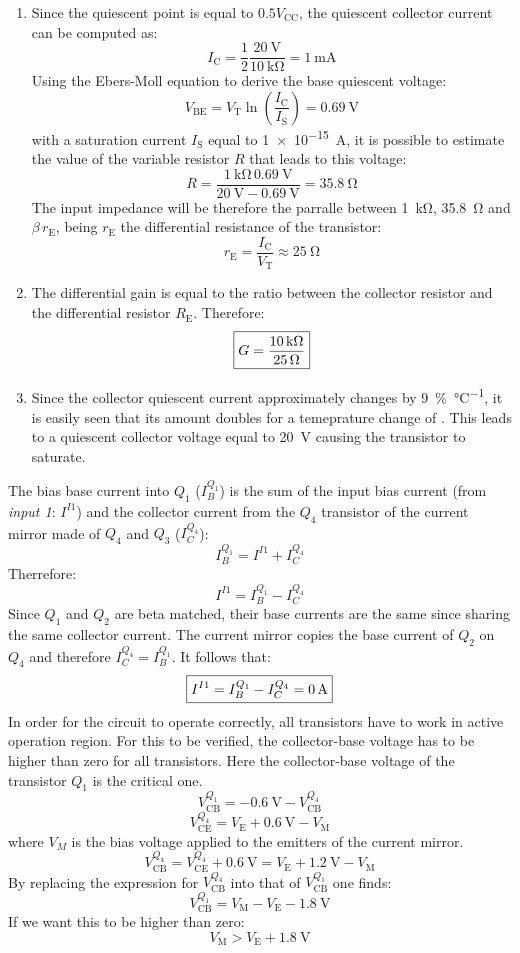 \begin{enumerate}
    \item
    Since the quiescent point is equal to $0.5V_\text{CC}$, the quiescent collector current can be computed as:
    \[I_\text{C}=\frac{1}{2}\frac{\SI{20}{\volt}}{\SI{10}{\kilo\ohm}}=\SI{1}{\milli\ampere}\]
    Using the Ebers-Moll equation to derive the base quiescent voltage:
    \[V_\text{BE}=V_\text{T}\ln\left(\frac{I_\text{C}}{I_\text{S}}\right)=\SI{0.69}{\volt}\]
    with a saturation current $I_\text{S}$ equal to \SI{1e-15}{\ampere}, it is possible to estimate the value of the variable resistor $R$ that leads to this voltage:
    \[R = \frac{\SI{1}{\kilo\ohm}\,\SI{0.69}{\volt}}{\SI{20}{\volt}-\SI{0.69}{\volt}}=\SI{35.8}{\ohm}\]
    The input impedance will be therefore the parralle between \SI{1}{\kilo\ohm}, \SI{35.8}{\ohm} and $\beta\,r_\text{E}$, being $r_\text{E}$ the differential resistance of the transistor:
    \[r_\text{E}=\frac{I_\text{C}}{V_\text{T}}\approx\SI{25}{\ohm}\]
    \item
    The differential gain is equal to the ratio between the collector resistor and the differential resistor $R_\text{E}$. Therefore:
    \[\boxed{G=\frac{\SI{10}{\kilo\ohm}}{\SI{25}{\ohm}}}\]
    \item
    Since the collector quiescent current approximately changes by \SI{9}{\percent\per\celsius}, it is easily seen that its amount doubles for a temeprature change of . This leads to a quiescent collector voltage equal to \SI{20}{\volt} causing the transistor to saturate.
\end{enumerate}

The bias base current into $Q_1$ ($I_B^{Q_1}$) is the sum of the input bias current (from \textit{input 1}: $I^{I1}$) and the collector current from the $Q_4$ transistor of the current mirror made of $Q_4$ and $Q_3$ ($I_C^{Q_4}$):
\[I_B^{Q_1}=I^{I1}+I_C^{Q_4}\]
Therrefore:
\[I^{I1}=I_B^{Q_1}-I_C^{Q_4}\]
Since $Q_1$ and $Q_2$ are beta matched, their base currents are the same since sharing the same collector current. The current mirror copies the base current of $Q_2$ on $Q_4$ and therefore $I_C^{Q_4}=I_B^{Q_1}$.
It follows that:
\[\boxed{I^{I1}=I_B^{Q_1}-I_C^{Q_4}=\SI{0}{\ampere}}\]
In order for the circuit to operate correctly, all transistors have to work in active operation region. For this to be verified, the collector-base voltage has to be higher than zero for all transistors. Here the collector-base voltage of the transistor $Q_1$ is the critical one.
\[V_\text{CB}^{Q_1}=-\SI{0.6}{\volt}-V_\text{CB}^{Q_4}\]
\[V_\text{CE}^{Q_4}=V_\text{E}+\SI{0.6}{\volt}-V_\text{M}\]
where $V_M$ is the bias voltage applied to the emitters of the current mirror.
\[V_\text{CB}^{Q_4}=V_\text{CE}^{Q_4}+\SI{0.6}{\volt}=V_\text{E}+\SI{1.2}{\volt}-V_\text{M}\]
By replacing the expression for $V_\text{CB}^{Q_4}$ into that of $V_\text{CB}^{Q_1}$ one finds:
\[V_\text{CB}^{Q_1}=V_\text{M}-V_\text{E}-\SI{1.8}{\volt}\]
If we want this to be higher than zero:
\[V_\text{M}>V_\text{E}+\SI{1.8}{\volt}\]
